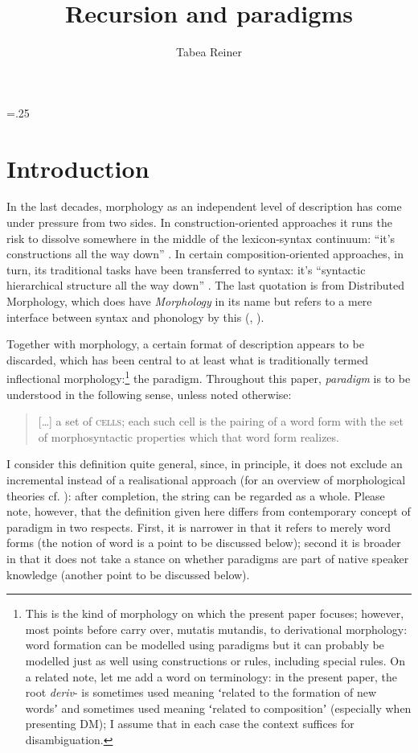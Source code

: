 \documentclass[output=paper]{langsci/langscibook}
\author{Tabea Reiner\affiliation{LMU München}}
\title{Recursion and paradigms}
\begin{document}
\multicolsep=.25\baselineskip
\maketitle

\section{Introduction} \label{reiner:1}

In the last decades, morphology as an independent level of description has come under pressure from two sides. In construction-oriented approaches it runs the risk to dissolve somewhere in the middle of the lexicon-syntax continuum: “it’s constructions all the way down” \citep[18]{Goldberg2006}. In certain composition-oriented approaches, in turn, its traditional tasks have been transferred to syntax: it’s “syntactic hierarchical structure all the way down” \citep[3]{HarleyHarley1999}. The last quotation is from Distributed Morphology, which does have \textit{Morphology} in its name but refers to a mere interface between syntax and phonology by this (\citealt[114]{HalleHalle1993}, \citealt[1]{Bobaljik2017}).

Together with morphology, a certain format of description appears to be discarded, which has been central to at least what is traditionally termed inflectional morphology:\footnote{This is the kind of morphology on which the present paper focuses; however, most points before  carry over, mutatis mutandis, to derivational morphology: word formation can be modelled using paradigms \citep{HathoutNamer2019} but it can probably be modelled just as well using constructions or rules, including special rules. On a related note, let me add a word on terminology: in the present paper, the root \textit{deriv}{}- is sometimes used meaning ʻrelated to the formation of new wordsʼ and sometimes used meaning ʻrelated to compositionʼ (especially when presenting DM); I assume that in each case the context suffices for disambiguation.} the paradigm. Throughout this paper, \textit{paradigm} is to be understood in the following sense, unless noted otherwise:

\begin{quote}
[…] a set of \textsc{cells}; each such cell is the pairing of a word form with the set of morphosyntactic properties which that word form realizes. \citep[147]{Stump2002}
\end{quote}

I consider this definition quite general, since, in principle, it does not exclude an incremental instead of a realisational approach (for an overview of morphological theories cf. \citealt{Stewart2016}): after completion, the string can be regarded as a whole. Please note, however, that the definition given here differs from  contemporary concept of paradigm in two respects. First, it is narrower in that it refers to merely word forms (the notion of word is a point to be discussed below); second it is broader in that it does not take a stance on whether paradigms are part of native speaker knowledge (another point to be discussed below).
\end{document}
